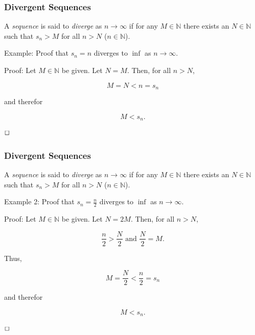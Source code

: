 \documentclass[10pt]{beamer}
\def\N{\mathbb{N}}                     %
\def\qed{ \hspace*{\fill} \Box}
\begin{document}
\begin{frame}
  \frametitle{Divergent Sequences}

  A \textit{sequence} is said to \textit{diverge} as $n \to \infty$ if for any $M \in \N$ there exists an $N \in \N$ such that $s_n > M$ for all $n > N$ ($n \in \N$).
  \vspace{5mm}

  Example: Proof that $s_n = n$ diverges to $\inf$ as $n \to \infty$.
  \vspace{5mm}

  Proof: Let $M \in \N$ be given. Let $N = M$. Then, for all $n > N$,

  \[ M = N < n = s_n \]

  and therefor

  \[ M < s_n. \]

  $\qed$

\end{frame}

\begin{frame}
  \frametitle{Divergent Sequences}

  A \textit{sequence} is said to \textit{diverge} as $n \to \infty$ if for any $M \in \N$ there exists an $N \in \N$ such that $s_n > M$ for all $n > N$ ($n \in \N$).
  \vspace{5mm}

  Example 2: Proof that $s_n = \frac{n}{2}$ diverges to $\inf$ as $n \to \infty$.
  \vspace{5mm}

  Proof: Let $M \in \N$ be given. Let $N = 2M$. Then, for all $n > N$,

  \[ \frac{n}{2} > \frac{N}{2} \text{ and } \frac{N}{2} = M. \]

  Thus,

  \[ M = \frac{N}{2} < \frac{n}{2} = s_n \]

  and therefor

  \[ M < s_n. \]

  $\qed$

\end{frame}





\end{document}

